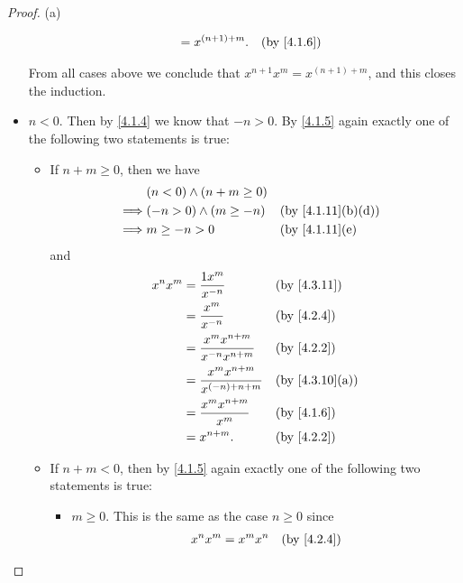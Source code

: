 \begin{proof}{(a)}
\begin{itemize}
\begin{itemize}
\begin{align*}
				                        & = x^{(n + 1) + m}. &  & \by{4.1.6}
			            \end{align*}
		      \end{itemize}
		      From all cases above we conclude that \(x^{n + 1} x^m = x^{(n + 1) + m}\), and this closes the induction.
		\item \(n < 0\).
		      Then by \cref{4.1.4} we know that \(-n > 0\).
		      By \cref{4.1.5} again exactly one of the following two statements is true:
		      \begin{itemize}
			      \item If \(n + m \geq 0\), then we have
			            \begin{align*}
				                     & (n < 0) \land (n + m \geq 0)                                      \\
				            \implies & (-n > 0) \land (m \geq -n)   &  & \text{(by \cref{4.1.11}(b)(d))} \\
				            \implies & m \geq -n > 0                &  & \text{(by \cref{4.1.11}(e)}
			            \end{align*}
			            and
			            \begin{align*}
				            x^n x^m & = \dfrac{1x^m}{x^{-n}}                    &  & \by{4.3.11}                  \\
				                    & = \dfrac{x^m}{x^{-n}}                     &  & \by{4.2.4}                   \\
				                    & = \dfrac{x^m x^{n + m}}{x^{-n} x^{n + m}} &  & \by{4.2.2}                   \\
				                    & = \dfrac{x^m x^{n + m}}{x^{(-n) + n + m}} &  & \text{(by \cref{4.3.10}(a))} \\
				                    & = \dfrac{x^m x^{n + m}}{x^m}              &  & \by{4.1.6}                   \\
				                    & = x^{n + m}.                              &  & \by{4.2.2}
			            \end{align*}
			      \item If \(n + m < 0\), then by \cref{4.1.5} again exactly one of the following two statements is true:
			            \begin{itemize}
				            \item \(m \geq 0\).
				                  This is the same as the case \(n \geq 0\) since
				                  \begin{align*}
					                  x^n x^m & = x^m x^n    &  & \by{4.2.4}                             \\

\end{align*}
\end{itemize}
\end{itemize}
\end{itemize}
\end{proof}
